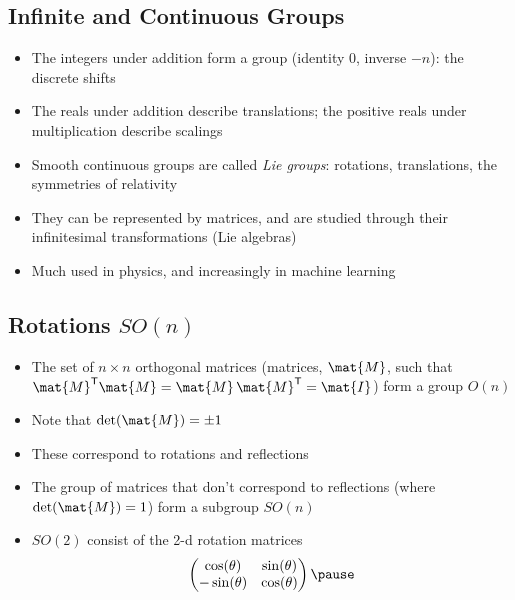 \begin{slide}
\section[-1]{Infinite and Continuous Groups}

\begin{PauseHighLight}
  \begin{itemize}
  \item The integers under addition form a group (identity 0, inverse
    $-n$): the discrete shifts\pause
  \item The reals under addition describe translations; the positive
    reals under multiplication describe scalings\pause
  \item Smooth continuous groups are called \emph{Lie groups}: rotations,
    translations, the symmetries of relativity\pause
  \item They can be represented by matrices, and are studied through
    their infinitesimal transformations (Lie algebras)\pause
  \item Much used in physics, and increasingly in machine learning\pause
  \end{itemize}
\end{PauseHighLight}

\end{slide}


\begin{slide}
  \section{Rotations $SO(n)$}
  
\begin{PauseHighLight}
  \begin{itemize}
  \item The set of $n\times n$ orthogonal matrices (matrices, $\mat{M}$,
    such that $\mat{M}^\tr \mat{M} = \mat{M}\, \mat{M}^\tr = \mat{I}$)
    form a group $O(n)$\pause
  \item Note that $\det(\mat{M}) = \pm 1$\pause
  \item These correspond to rotations and reflections\pause
  \item The group of matrices that don't correspond to reflections
    (where $\det(\mat{M})=1$) form a subgroup $SO(n)$\pause
  \item $SO(2)$ consist of the 2-d rotation matrices
    \begin{align*}
      \begin{pmatrix}
        \cos(\theta) & \sin(\theta) \\
        -\sin(\theta) & \cos(\theta)
      \end{pmatrix}\pause
    \end{align*}
  \end{itemize}
\end{PauseHighLight}

\end{slide}


